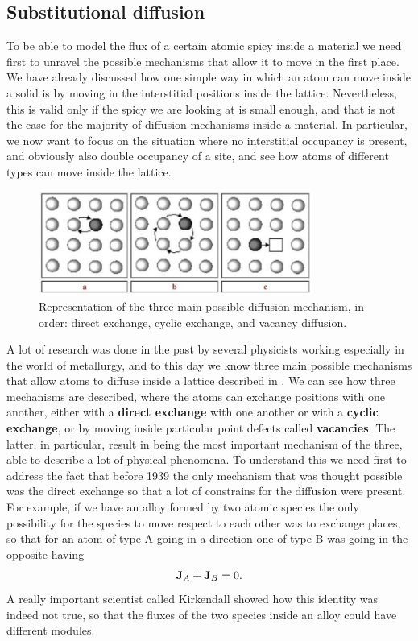 \subsection{Substitutional diffusion}

To be able to model the flux of a certain atomic spicy inside a material we need first to unravel the possible mechanisms that allow it to move in the first place. We have already discussed how one simple way in which an atom can move inside a solid is by moving in the interstitial positions inside the lattice. Nevertheless, this is valid only if the spicy we are looking at is small enough, and that is not the case for the majority of diffusion mechanisms inside a material. In particular, we now want to focus on the situation where no interstitial occupancy is present, and obviously also double occupancy of a site, and see how atoms of different types can move inside the lattice.

\begin{figure}[t]
    \centering
    \includegraphics[width=0.8\textwidth]{Immagini/DiffMech.png}
    \caption
    {
        Representation of the three main possible diffusion mechanism, in order: direct exchange, cyclic exchange, and vacancy diffusion.
    }
    \label{fig:DiffMech}
\end{figure}
A lot of research was done in the past by several physicists working especially in the world of metallurgy, and to this day we know three main possible mechanisms that allow atoms to diffuse inside a lattice described in . We can see how three mechanisms are described, where the atoms can exchange positions with one another, either with a \textbf{direct exchange} with one another or with a \textbf{cyclic exchange}, or by moving inside particular point defects called \textbf{vacancies}. The latter, in particular, result in being the most important mechanism of the three, able to describe a lot of physical phenomena. To understand this we need first to address the fact that before 1939 the only mechanism that was thought possible was the direct exchange so that a lot of constrains for the diffusion were present. For example, if we have an alloy formed by two atomic species the only possibility for the species to move respect to each other was to exchange places, so that for an atom of type A going in a direction one of type B was going in the opposite having
\begin{equation}
    \label{eq:FluxConstr}
    \vb{J}_A  + \vb{J}_B = 0.
\end{equation}
A really important scientist called Kirkendall showed how this identity was indeed not true, so that the fluxes of the two species inside an alloy could have different modules. 

